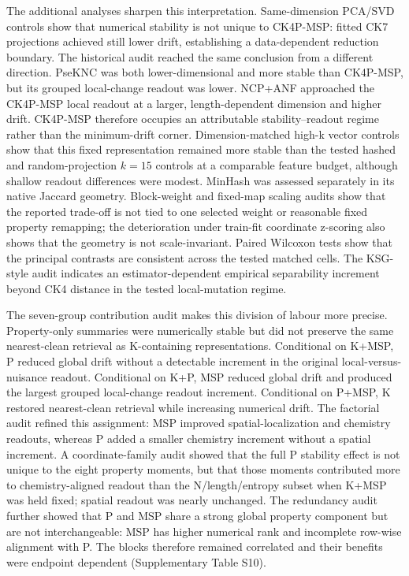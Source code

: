 The additional analyses sharpen this interpretation. Same-dimension PCA/SVD controls show that numerical stability is not unique to CK4P-MSP: fitted CK7 projections achieved still lower drift, establishing a data-dependent reduction boundary. The historical audit reached the same conclusion from a different direction. PseKNC was both lower-dimensional and more stable than CK4P-MSP, but its grouped local-change readout was lower. NCP+ANF approached the CK4P-MSP local readout at a larger, length-dependent dimension and higher drift. CK4P-MSP therefore occupies an attributable stability--readout regime rather than the minimum-drift corner. Dimension-matched high-k vector controls show that this fixed representation remained more stable than the tested hashed and random-projection $k=15$ controls at a comparable feature budget, although shallow readout differences were modest. MinHash was assessed separately in its native Jaccard geometry. Block-weight and fixed-map scaling audits show that the reported trade-off is not tied to one selected weight or reasonable fixed property remapping; the deterioration under train-fit coordinate z-scoring also shows that the geometry is not scale-invariant. Paired Wilcoxon tests show that the principal contrasts are consistent across the tested matched cells. The KSG-style audit indicates an estimator-dependent empirical separability increment beyond CK4 distance in the tested local-mutation regime.

The seven-group contribution audit makes this division of labour more precise. Property-only summaries were numerically stable but did not preserve the same nearest-clean retrieval as K-containing representations. Conditional on K+MSP, P reduced global drift without a detectable increment in the original local-versus-nuisance readout. Conditional on K+P, MSP reduced global drift and produced the largest grouped local-change readout increment. Conditional on P+MSP, K restored nearest-clean retrieval while increasing numerical drift. The factorial audit refined this assignment: MSP improved spatial-localization and chemistry readouts, whereas P added a smaller chemistry increment without a spatial increment. A coordinate-family audit showed that the full P stability effect is not unique to the eight property moments, but that those moments contributed more to chemistry-aligned readout than the N/length/entropy subset when K+MSP was held fixed; spatial readout was nearly unchanged. The redundancy audit further showed that P and MSP share a strong global property component but are not interchangeable: MSP has higher numerical rank and incomplete row-wise alignment with P. The blocks therefore remained correlated and their benefits were endpoint dependent (Supplementary Table S10).

